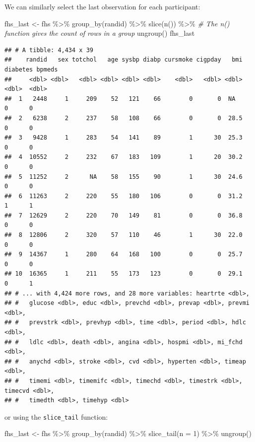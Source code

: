 \documentclass[
]{book}
\newenvironment{Shaded}{\begin{snugshade}}{\end{snugshade}}
\newcommand{\AttributeTok}[1]{\textcolor[rgb]{0.77,0.63,0.00}{#1}}
\newcommand{\CommentTok}[1]{\textcolor[rgb]{0.56,0.35,0.01}{\textit{#1}}}
\newcommand{\DecValTok}[1]{\textcolor[rgb]{0.00,0.00,0.81}{#1}}
\newcommand{\FunctionTok}[1]{\textcolor[rgb]{0.00,0.00,0.00}{#1}}
\newcommand{\NormalTok}[1]{#1}
\newcommand{\OtherTok}[1]{\textcolor[rgb]{0.56,0.35,0.01}{#1}}
\newcommand{\SpecialCharTok}[1]{\textcolor[rgb]{0.00,0.00,0.00}{#1}}
\begin{document}
We can similarly select the last observation for each participant:

\begin{Shaded}
\begin{Highlighting}[]
\NormalTok{fhs\_last }\OtherTok{\textless{}{-}}\NormalTok{ fhs }\SpecialCharTok{\%\textgreater{}\%} 
  \FunctionTok{group\_by}\NormalTok{(randid) }\SpecialCharTok{\%\textgreater{}\%} 
  \FunctionTok{slice}\NormalTok{(}\FunctionTok{n}\NormalTok{()) }\SpecialCharTok{\%\textgreater{}\%} \CommentTok{\# The \textasciigrave{}n()\textasciigrave{} function gives the count of rows in a group }
  \FunctionTok{ungroup}\NormalTok{()}
\NormalTok{fhs\_last}
\end{Highlighting}
\end{Shaded}

\begin{verbatim}
## # A tibble: 4,434 x 39
##    randid   sex totchol   age sysbp diabp cursmoke cigpday   bmi diabetes bpmeds
##     <dbl> <dbl>   <dbl> <dbl> <dbl> <dbl>    <dbl>   <dbl> <dbl>    <dbl>  <dbl>
##  1   2448     1     209    52   121    66        0       0  NA          0      0
##  2   6238     2     237    58   108    66        0       0  28.5        0      0
##  3   9428     1     283    54   141    89        1      30  25.3        0      0
##  4  10552     2     232    67   183   109        1      20  30.2        0      0
##  5  11252     2      NA    58   155    90        1      30  24.6        0      0
##  6  11263     2     220    55   180   106        0       0  31.2        1      1
##  7  12629     2     220    70   149    81        0       0  36.8        0      0
##  8  12806     2     320    57   110    46        1      30  22.0        0      0
##  9  14367     1     280    64   168   100        0       0  25.7        0      0
## 10  16365     1     211    55   173   123        0       0  29.1        0      1
## # ... with 4,424 more rows, and 28 more variables: heartrte <dbl>,
## #   glucose <dbl>, educ <dbl>, prevchd <dbl>, prevap <dbl>, prevmi <dbl>,
## #   prevstrk <dbl>, prevhyp <dbl>, time <dbl>, period <dbl>, hdlc <dbl>,
## #   ldlc <dbl>, death <dbl>, angina <dbl>, hospmi <dbl>, mi_fchd <dbl>,
## #   anychd <dbl>, stroke <dbl>, cvd <dbl>, hyperten <dbl>, timeap <dbl>,
## #   timemi <dbl>, timemifc <dbl>, timechd <dbl>, timestrk <dbl>, timecvd <dbl>,
## #   timedth <dbl>, timehyp <dbl>
\end{verbatim}

or using the \texttt{slice\_tail} function:

\begin{Shaded}
\begin{Highlighting}[]
\NormalTok{fhs\_last }\OtherTok{\textless{}{-}}\NormalTok{ fhs }\SpecialCharTok{\%\textgreater{}\%} 
  \FunctionTok{group\_by}\NormalTok{(randid) }\SpecialCharTok{\%\textgreater{}\%} 
  \FunctionTok{slice\_tail}\NormalTok{(}\AttributeTok{n =} \DecValTok{1}\NormalTok{) }\SpecialCharTok{\%\textgreater{}\%} 
  \FunctionTok{ungroup}\NormalTok{()}
\end{Highlighting}
\end{Shaded}
\end{document}
